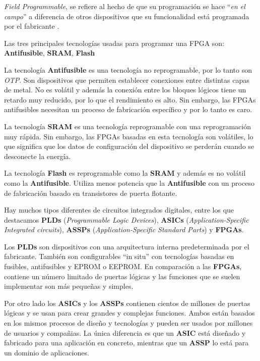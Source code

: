 \textit{Field Programmable}, se refiere al hecho de que su programación se hace ``\textit{en el campo}'' a diferencia de otros dispositivos 
que su funcionalidad está programada por el fabricante \cite{maxfield1}.

Las tres principales tecnologías usadas para programar una FPGA son: \textbf{Antifusible}, \textbf{SRAM}, \textbf{Flash}

La tecnología \textbf{Antifusible} es una tecnología no reprogramable, por lo tanto son \textit{OTP}. Son dispositivos que permiten establecer 
conexiones entre distintas capas de metal. No es volátil y además la conexión entre los bloques lógicos tiene un retardo muy reducido, por lo 
que el rendimiento es alto. Sin embargo, las FPGAs antifusibles necesitan un proceso de fabricación específico y por lo tanto es caro. 

La tecnología \textbf{SRAM} es una tecnología reprogramable con una reprogramación muy rápida. Sin embargo, las FPGAs basadas en esta tecnología 
son volátiles, lo que significa que los datos de configuración del dispositivo se perderán cuando se desconecte la energía. 

La tecnología \textbf{Flash} es reprogramable como la \textbf{SRAM} y además es no volátil como la \textbf{Antifusible}. Utiliza menos potencia 
que la \textbf{Antifusible} con un proceso de fabricación basado en transistores de puerta flotante.

Hay muchos tipos diferentes de circuitos integrados digitales, entre los que destacamos \textbf{PLDs} (\textit{Programmable Logic Devices}), 
\textbf{ASICs} (\textit{Application-Specific Integrated circuits}), \textbf{ASSPs} (\textit{Application-Specific Standard Parts}) y \textbf{FPGAs}.

Los \textbf{PLDs} son dispositivos con una arquitectura interna predeterminada por el fabricante. También son configurables ``in situ'' con tecnologías basadas en fusibles, 
antifusibles y EPROM o EEPROM. En comparación a las \textbf{FPGAs}, contiene un número limitado de puertas lógicas 
y las funciones que se suelen implementar son más pequeñas y simples.

Por otro lado los \textbf{ASICs} y los \textbf{ASSPs} contienen cientos de millones de puertas lógicas y se usan para crear grandes y complejas 
funciones. Ambos están basados en los mismos procesos de diseño y tecnologías y pueden ser usados por millones de usuarios y compañias. La 
única diferencia es que un \textbf{ASIC} está diseñado y fabricado para una aplicación en concreto, mientras que un \textbf{ASSP} lo está 
para un dominio de aplicaciones.

